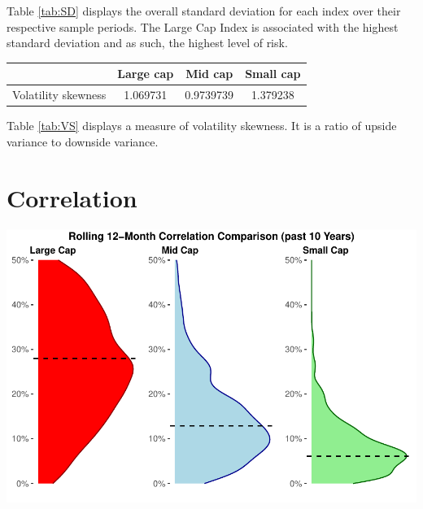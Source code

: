 \documentclass[11pt,preprint, authoryear]{elsarticle}
\let\origfigure\figure
\let\endorigfigure\endfigure
\renewenvironment{figure}[1][2] {
    \expandafter\origfigure\expandafter[H]
} {
    \endorigfigure
}
\let\origtable\table
\let\endorigtable\endtable
\renewenvironment{table}[1][2] {
    \expandafter\origtable\expandafter[H]
} {
    \endorigtable
}
\numberwithin{equation}{section}
\numberwithin{figure}{section}
\numberwithin{table}{section}
\begin{document}
Table \ref{tab:SD} displays the overall standard deviation for each
index over their respective sample periods. The Large Cap Index is
associated with the highest standard deviation and as such, the highest
level of risk.

\begin{table}[h]
\begin{center}
    \begin{tabular}{| c | c | c | c |}
    \hline
         & Large cap & Mid cap & Small cap \\
        \hline
        Volatility skewness & 1.069731 & 0.9739739 & 1.379238 \\
        \hline
    \end{tabular}
    \caption{Volatility skewness}
    \label{tab:VS}
\end{center}
\end{table}

Table \ref{tab:VS} displays a measure of volatility skewness. It is a
ratio of upside variance to downside variance.

\hypertarget{correlation}{%
\section{\texorpdfstring{Correlation
\label{Correlation}}{Correlation }}\label{correlation}}

\begin{figure}[H]

{\centering \includegraphics{Volatility-of-Shares_files/figure-latex/Figure11-1} 

}

\caption{Rolling Correlation Comparison of the Indexes \label{Figure11}}\label{fig:Figure11}
\end{figure}
\end{document}
